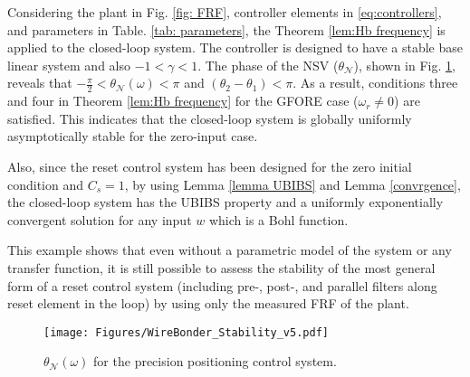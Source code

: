 Considering the plant in Fig. \ref{fig: FRF}, controller elements in \eqref{eq:controllers}, and parameters in Table. \ref{tab: parameters}, the Theorem \ref{lem:Hb frequency} is applied to the closed-loop system. The controller is designed to have a stable base linear system and also $-1<\gamma<1$. The phase of the NSV ($\theta_{\mathcal{N}}$), shown in Fig. \ref{fig: theta_N}, reveals that $-\frac{\pi}{2} < \theta_{\mathcal{N}}(\omega) < \pi$ and $(\theta_2 - \theta_1) < \pi$. As a result, conditions three and four in Theorem \ref{lem:Hb frequency} for the GFORE case ($\omega_r \neq 0$) are satisfied. This indicates that the closed-loop system is globally uniformly asymptotically stable for the zero-input case.

Also, since the reset control system has been designed for the zero initial condition and $C_s=1$, by using Lemma \ref{lemma UBIBS} and Lemma \ref{convrgence}, the closed-loop system has the UBIBS property and a uniformly exponentially convergent solution for any input $w$ which is a Bohl function.

This example shows that even without a parametric model of the system or any transfer function, it is still possible to assess the stability of the most general form of a reset control system (including pre-, post-, and parallel filters along reset element in the loop) by using only the measured FRF of the plant.

\begin{figure}
	\centering
 	\texttt{[image: Figures/WireBonder\_Stability\_v5.pdf]}
	\caption{ $\theta_{\mathcal{N}}(\omega)$ for the precision positioning control system.}
	\label{fig: theta_N}
\end{figure}